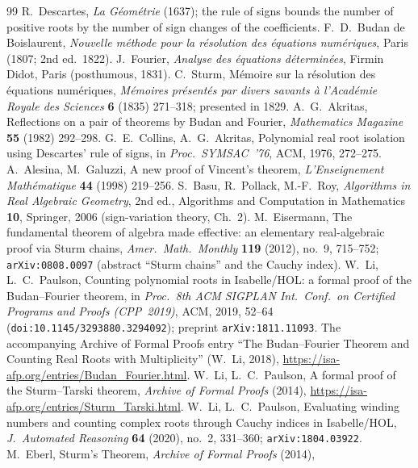 \documentclass[11pt]{article}
\begin{document}
\begin{thebibliography}{99}\small
{} R.~Descartes, \emph{La G\'eom\'etrie} (1637); the rule of signs bounds the number
of positive roots by the number of sign changes of the coefficients.
 F.~D.~Budan de Boislaurent, \emph{Nouvelle m\'ethode pour la r\'esolution des
\'equations num\'eriques}, Paris (1807; 2nd ed.\ 1822).
 J.~Fourier, \emph{Analyse des \'equations d\'etermin\'ees}, Firmin Didot, Paris
(posthumous, 1831).
 C.~Sturm, M\'emoire sur la r\'esolution des \'equations num\'eriques, \emph{M\'emoires
pr\'esent\'es par divers savants \`a l'Acad\'emie Royale des Sciences} \textbf{6} (1835) 271--318;
presented in 1829.
 A.~G.~Akritas, Reflections on a pair of theorems by Budan and Fourier, \emph{Mathematics
Magazine} \textbf{55} (1982) 292--298.
 G.~E.~Collins, A.~G.~Akritas, Polynomial real root isolation using Descartes'
rule of signs, in \emph{Proc.\ SYMSAC~'76}, ACM, 1976, 272--275.
 A.~Alesina, M.~Galuzzi, A new proof of Vincent's theorem, \emph{L'Enseignement
Math\'ematique} \textbf{44} (1998) 219--256.
 S.~Basu, R.~Pollack, M.-F.~Roy, \emph{Algorithms in Real Algebraic Geometry}, 2nd ed.,
Algorithms and Computation in Mathematics \textbf{10}, Springer, 2006 (sign-variation theory, Ch.~2).
 M.~Eisermann, The fundamental theorem of algebra made effective: an elementary
real-algebraic proof via Sturm chains, \emph{Amer.\ Math.\ Monthly} \textbf{119} (2012), no.~9,
715--752; \texttt{arXiv:0808.0097} (abstract ``Sturm chains'' and the Cauchy index).
 W.~Li, L.~C.~Paulson, Counting polynomial roots in Isabelle/HOL: a formal proof of the
Budan--Fourier theorem, in \emph{Proc.\ 8th ACM SIGPLAN Int.\ Conf.\ on Certified Programs and Proofs
(CPP~2019)}, ACM, 2019, 52--64 (\texttt{doi:10.1145/3293880.3294092}); preprint
\texttt{arXiv:1811.11093}. The accompanying Archive of Formal Proofs entry ``The Budan--Fourier Theorem
and Counting Real Roots with Multiplicity'' (W.~Li, 2018), \url{https://isa-afp.org/entries/Budan_Fourier.html}.
 W.~Li, L.~C.~Paulson, A formal proof of the Sturm--Tarski theorem, \emph{Archive of
Formal Proofs} (2014), \url{https://isa-afp.org/entries/Sturm_Tarski.html}.
 W.~Li, L.~C.~Paulson, Evaluating winding numbers and counting complex roots through
Cauchy indices in Isabelle/HOL, \emph{J.~Automated Reasoning} \textbf{64} (2020), no.~2, 331--360;
\texttt{arXiv:1804.03922}.
 M.~Eberl, Sturm's Theorem, \emph{Archive of Formal Proofs} (2014),

\end{thebibliography}
\end{document}
